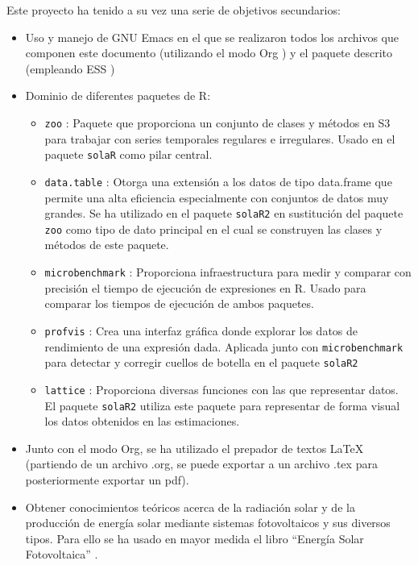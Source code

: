 Este proyecto ha tenido a su vez una serie de objetivos secundarios:
\begin{itemize}
\item Uso y manejo de GNU Emacs \cite{emacs85} en el que se realizaron todos los archivos que componen este documento (utilizando el modo Org \cite{dominik03}) y el paquete descrito (empleando ESS \cite{ess24})
\item Dominio de diferentes paquetes de R:
\begin{itemize}
\item \texttt{zoo} \cite{zeileis05}: Paquete que proporciona un conjunto de clases y métodos en S3 para trabajar con series temporales regulares e irregulares.
Usado en el paquete \texttt{solaR} como pilar central.
\item \texttt{data.table} \cite{barrett24}: Otorga una extensión a los datos de tipo data.frame que permite una alta eficiencia especialmente con conjuntos de datos muy grandes.
Se ha utilizado en el paquete \texttt{solaR2} en sustitución del paquete \texttt{zoo} como tipo de dato principal en el cual se construyen las clases y métodos de este paquete.
\item \texttt{microbenchmark} \cite{mersmann23}: Proporciona infraestructura para medir y comparar con precisión el tiempo de ejecución de expresiones en R.
Usado para comparar los tiempos de ejecución de ambos paquetes.
\item \texttt{profvis} \cite{wickham24}: Crea una interfaz gráfica donde explorar los datos de rendimiento de una expresión dada.
Aplicada junto con \texttt{microbenchmark} para detectar y corregir cuellos de botella en el paquete \texttt{solaR2}
\item \texttt{lattice} \cite{sarkar08}: Proporciona diversas funciones con las que representar datos.
El paquete \texttt{solaR2} utiliza este paquete para representar de forma visual los datos obtenidos en las estimaciones.
\end{itemize}
\item Junto con el modo Org, se ha utilizado el prepador de textos \LaTeX{} (partiendo de un archivo .org, se puede exportar a un archivo .tex para posteriormente exportar un pdf).
\item Obtener conocimientos teóricos acerca de la radiación solar y de la producción de energía solar mediante sistemas fotovoltaicos y sus diversos tipos.
Para ello se ha usado en mayor medida el libro ``Energía Solar Fotovoltaica'' \cite{Perpinan2023}.
\end{itemize}

